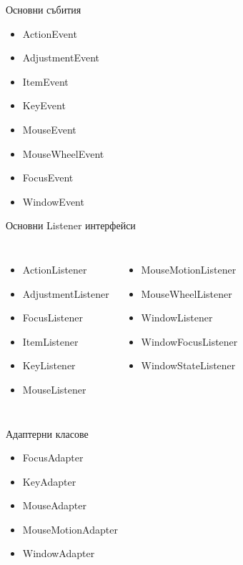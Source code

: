\documentclass{beamer}
\begin{document}
\begin{frame}{Основни събития}
  \transdissolve
  \begin{itemize}
  \item ActionEvent
  \item AdjustmentEvent
  \item ItemEvent
  \item KeyEvent
  \item MouseEvent
  \item MouseWheelEvent
  \item FocusEvent
  \item WindowEvent
  \end{itemize}
\end{frame}

\begin{frame}{Основни Listener интерфейси}
  \transdissolve
  \begin{columns}
    \begin{itemize}
      \item ActionListener
      \item AdjustmentListener
      \item FocusListener
      \item ItemListener
      \item KeyListener
      \item MouseListener
    \end{itemize}
    \begin{itemize}
      \item MouseMotionListener
      \item MouseWheelListener
      \item WindowListener
      \item WindowFocusListener
      \item WindowStateListener
    \end{itemize}

  \end{columns}
\end{frame}

\begin{frame}{Адаптерни класове}
  \transdissolve
  \begin{itemize}
  \item FocusAdapter
  \item KeyAdapter
  \item MouseAdapter
  \item MouseMotionAdapter
  \item WindowAdapter
  \end{itemize}
\end{frame}
\end{document}
